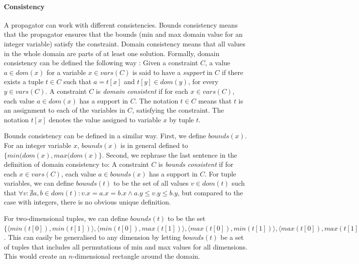 \documentclass[a4paper,11pt]{article}
\begin{document}
\paragraph{Consistency}
A propagator can work with different consistencies. Bounds consistency means that the propagator ensures that the bounds (min and max domain value for an integer variable) satisfy the constraint. Domain consistency means that all values in the whole domain are parts of at least one solution. Formally, domain consistency can be defined the following way \cite{FruehwirthMS06}: Given a constraint $C$, a value $a\in \mathit{dom}(x)$ for a variable $x\in \mathit{vars}(C)$ is said to have a \textit{support} in $C$ if there exists a tuple $t\in C$ such that $a=t[x]$ and $t[y]\in \mathit{dom}(y)$, for every $y\in \mathit{vars}(C)$. A constraint $C$ is \textit{domain consistent} if for each $x\in \mathit{vars}(C)$, each value $a\in \mathit{dom}(x)$ has a support in $C$. The notation $t\in C$ means that $t$ is an assignment to each of the variables in $C$, satisfying the constraint. The notation $t[x]$ denotes the value assigned to variable $x$ by tuple $t$. 

Bounds consistency can be defined in a similar way. First, we define $\mathit{bounds}(x)$. For an integer variable $x$, $\mathit{bounds}(x)$ is in general defined to $\{\mathit{min}(\mathit{dom}(x),\mathit{max}(\mathit{dom}(x)\}$. Second, we rephrase the last sentence in the definition of domain consistency to: A constraint $C$ is \textit{bounds consistent} if for each $x\in \mathit{vars}(C)$, each value $a\in \mathit{bounds}(x)$ has a support in $C$.  For tuple variables, we can define $\mathit{bounds}(t)$ to be the set of all values $v\in \mathit{dom}(t)$ such that $\forall v:\nexists a,b\in \mathit{dom}(t):v.x=a.x=b.x \land a.y \le v.y \le b.y$, but compared to the case with integers, there is no obvious unique definition.

For two-dimensional tuples, we can define $\mathit{bounds}(t)$ to be the set $\lbrace \allowbreak
\langle \mathit{min}(t[0]), \mathit{min}(t[1]) \rangle, \allowbreak
\langle \mathit{min}(t[0]), \mathit{max}(t[1]) \rangle, \allowbreak
\langle \mathit{max}(t[0]), \mathit{min}(t[1]) \rangle, \allowbreak
\langle \mathit{max}(t[0]), \mathit{max}(t[1]) \rangle, \allowbreak
\rbrace$. This can easily be generalised to any dimension by letting $\mathit{bounds}(t)$ be a set of tuples that includes all permutations of min and max values for all dimensions. This would create an $n$-dimensional rectangle around the domain.
\end{document}

